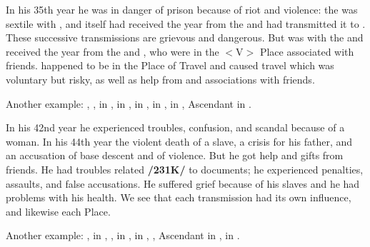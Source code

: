 In his 35th year he was in danger of prison because of riot and
violence: the \Moon\xspace was sextile with \Mars, and \Mars\xspace itself had received the year from the \Moon\xspace and had transmitted it to \Saturn. These successive transmissions are grievous and dangerous. But \Jupiter\xspace was with the \Moon\xspace and received the year from the \Sun\xspace and \Venus, who were in the $<$V$>$ Place associated with friends. \Jupiter\xspace happened to be in the Place of Travel and caused travel which was voluntary but risky, as well as help from and associations with friends.

Another example: \Sun, \Mars, \Mercury\xspace in \Scorpio, \Saturn\xspace in \Aries, \Moon\xspace in \Virgo, \Jupiter\xspace in \Taurus, \Venus\xspace in \Libra, Ascendant in \Sagittarius. 

In his 42nd year he experienced troubles, confusion, and scandal
because of a woman. In his 44th year the violent death of a slave, a crisis for his father, and an accusation of base descent and of violence. But he got help and gifts from friends. He had troubles related \textbf{/231K/} to documents; he experienced penalties, assaults, and false accusations. He suffered grief because of his slaves and he had problems with his health. We see that each transmission had its own influence, and likewise each Place.

Another example: \Sun, \Jupiter\xspace in \Capricorn, \Moon, \Saturn\xspace in \Leo, \Mars\xspace in \Pisces, \Venus, Ascendant
in \Scorpio, \Mercury\xspace in \Sagittarius. 

